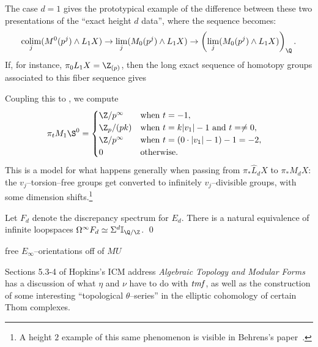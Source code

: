 \begin{remark}
The case $d = 1$ gives the prototypical example of the difference between these two presentations of the ``exact height $d$ data'', where the sequence becomes: \[\colim_j (M^0(p^j) \sm L_1 X) \to \lim_j (M_0(p^j) \sm L_1 X) \to \left( \lim_j (M_0(p^j) \sm L_1 X) \right)_{\Q}.\]  If, for instance, $\pi_0 L_1 X = \Z_{(p)}$, then the long exact sequence of homotopy groups associated to this fiber sequence gives
\begin{center}
\end{center}
Coupling this to , we compute
\begin{align*}
\pi_t M_1 \S^0 & = \begin{cases} \Z/p^\infty & \text{when $t = -1$}, \\ \Z_p / (pk) & \text{when $t = k|v_1| - 1$ and $t = \ne 0$}, \\ \Z/p^\infty & \text{when $t = (0 \cdot |v_1| - 1) - 1 = -2$}, \\ 0 & \text{otherwise}. \end{cases}
\end{align*}
This is a model for what happens generally when passing from $\pi_* \widehat L_d X$ to $\pi_* M_d X$: the $v_j$--torsion--free groups get converted to infinitely $v_j$--divisible groups, with some dimension shifts.\footnote{A height $2$ example of this same phenomenon is visible in Behrens's paper~\cite[Section 7]{BehrensRevisited}.}
\end{remark}




\begin{theorem}
Let $F_d$ denote the discrepancy spectrum for $E_d$.  There is a natural equivalence of infinite loopspaces $\Loops^\infty F_d \simeq \Susp^d \mathbb I_{\Q/\Z}$. \qed
\end{theorem}




free $E_\infty$--orientations off of $MU$






Sections 5.3-4 of Hopkins's ICM address \textit{Algebraic Topology and Modular Forms} has a discussion of what $\eta$ and $\nu$ have to do with $\mathit{tmf}$, as well as the construction of some interesting ``topological $\theta$--series'' in the elliptic cohomology of certain Thom complexes.



